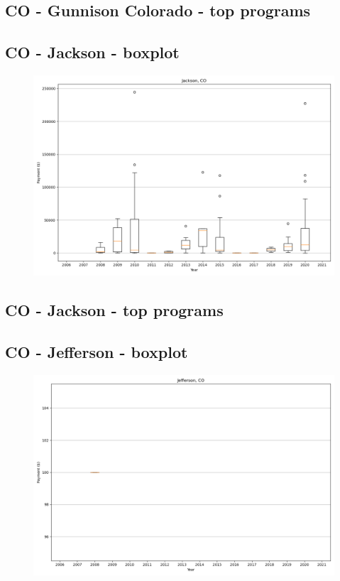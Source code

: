 \subsection*{CO - Gunnison Colorado - top programs}

\newpage
\subsection*{CO - Jackson - boxplot}
\begin{figure}[h]
\centering
\includegraphics[width=7in]{../output/boxplots/counties/Jackson-CO_boxplot.png}
\end{figure}


\subsection*{CO - Jackson - top programs}

\newpage
\subsection*{CO - Jefferson - boxplot}
\begin{figure}[h]
\centering
\includegraphics[width=7in]{../output/boxplots/counties/Jefferson-CO_boxplot.png}
\end{figure}


